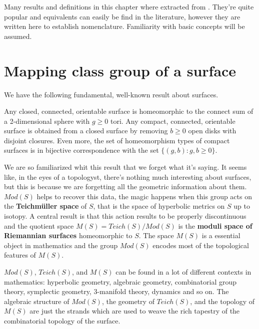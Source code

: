 Many results and definitions in this chapter where extracted from \cite[Farb]{Farb}. They're quite popular and equivalents can easily be find in the literature, however they are written here to establish nomenclature. Familiarity with basic concepts will be assumed.

\section{Mapping class group of a surface}

We have the following fundamental, well-known result about surfaces.

\begin{theorem}\label{CST}
Any closed, connected, orientable surface is homeomorphic to the connect sum of a 2-dimensional sphere with $g \geq 0$ tori. Any compact, connected, orientable surface is obtained from a closed surface by removing $b \geq 0 $ open disks with disjoint closures. Even more, the set of homeomorphism types of compact surfaces is in bijective correspondence with the set $\{ (g, b) : g, b \geq 0\}$.
\end{theorem}

We are so familiarized whit this result that we forget what it's saying. It seems like, in the eyes of a topologyst, there's nothing much interesting about surfaces, but this is because we are forgetting all the geometric information about them. $Mod(S)$ helps to recover this data, the magic happens when this group acts on the \textbf{Teichmüller space} of $S$, that is the space of hyperbolic metrics on $S$ up to isotopy. A central result is that this action results to be properly discontinuous and the quotient space $M(S) = Teich(S)/ Mod(S)$ is the \textbf{moduli space of Riemannian surfaces} homeomorphic to $S$. The space $M(S)$ is a essential object in mathematics and the group $Mod(S)$ encodes most of the topological features of $M(S)$.

$Mod(S)$, $Teich(S)$, and $M(S)$ can be found in a lot of different contexts in mathematics: hyperbolic geometry, algebraic geometry, combinatorial group theory, symplectic geometry, 3-manifold theory, dynamics and so on. The algebraic structure of $Mod(S)$, the geometry of $Teich(S)$, and the topology of $M(S)$ are just the strands which are used to weave the rich tapestry of the combinatorial topology of the surface.

